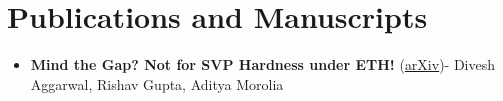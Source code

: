 \documentclass[10pt,a4paper,sans,colorlinks]{moderncv}        %
\begin{document}
\begin{comment}
	

	\section{Academic Achievements}
	
	
	
	\begin{itemize}
		
		\item{\cventry{2021}{ Qualified entrance exam of Chennai Mathematical Institute}{CMI Entrance}{}{}{}}
		\item{\cventry{2020}{Qualified with AIR-1586}{KVPY-SX}{}{}{}}		
		\item{\cventry{2019}{Qualified with AIR-894}{KVPY-SA}{}{}{}}		
		\item{\cventry{2021}{Qualified with AIR-1054}{JEE-Mains}{}{}{}}
		\item{\cventry{2021}{Qualified with AIR-1631}{JEE-Advanced}{}{}{}}		
		
		\item{\cventry{2021}{Qualified with AIR-18}{ISI Entrance Examination}{}{}{}}
		\item{\cventry{2022}{Qualified for MMC(Madhava Maths Competition) Camp}{MMC }{}{}{}}		
		
	\end{itemize}%
\end{comment}
	\section{Publications and Manuscripts}
	\begin{itemize}
		\item \textbf{Mind the Gap? Not for SVP Hardness under ETH!} (\href{https://arxiv.org/abs/2504.02695}{arXiv})- Divesh Aggarwal, Rishav Gupta, Aditya Morolia
	\end{itemize}
\end{document}
